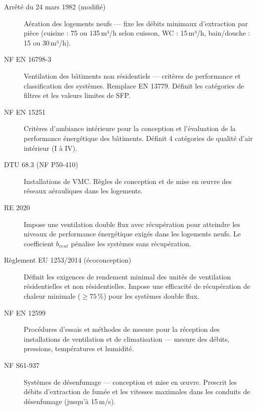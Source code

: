 \begin{description}
  \item[Arrêté du 24 mars 1982 (modifié)] Aération des logements neufs — fixe les débits minimaux d'extraction par pièce (cuisine : 75 ou 135\,m³/h selon cuisson, WC : 15\,m³/h, bain/douche : 15 ou 30\,m³/h).

  \item[NF EN 16798-3] Ventilation des bâtiments non résidentiels — critères de performance et classification des systèmes. Remplace EN 13779. Définit les catégories de filtres et les valeurs limites de SFP.

  \item[NF EN 15251] Critères d'ambiance intérieure pour la conception et l'évaluation de la performance énergétique des bâtiments. Définit 4 catégories de qualité d'air intérieur (I à IV).

  \item[DTU 68.3 (NF P50-410)] Installations de VMC. Règles de conception et de mise en œuvre des réseaux aérauliques dans les logements.

  \item[RE 2020] Impose une ventilation double flux avec récupération pour atteindre les niveaux de performance énergétique exigés dans les logements neufs. Le coefficient $b_{vent}$ pénalise les systèmes sans récupération.

  \item[Règlement EU 1253/2014 (écoconception)] Définit les exigences de rendement minimal des unités de ventilation résidentielles et non résidentielles. Impose une efficacité de récupération de chaleur minimale ($\geq 75\,\%$) pour les systèmes double flux.

  \item[NF EN 12599] Procédures d'essais et méthodes de mesure pour la réception des installations de ventilation et de climatisation — mesure des débits, pressions, températures et humidité.

  \item[NF S61-937] Systèmes de désenfumage — conception et mise en œuvre. Prescrit les débits d'extraction de fumée et les vitesses maximales dans les conduits de désenfumage (jusqu'à 15\,m/s).
\end{description}

